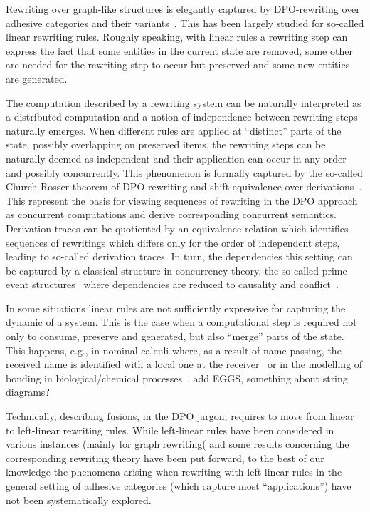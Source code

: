 Rewriting over graph-like structures is elegantly captured by
DPO-rewriting over adhesive categories and their
variants~\cite{lack2005adhesive,ehrig2006weak}.  This has been largely
studied for so-called linear rewriting rules. Roughly speaking, with
linear rules a rewriting step can express the fact that some entities
in the current state are removed, some other are needed for the
rewriting step to occur but preserved and some new entities are
generated.

The computation described by a rewriting system can be naturally
interpreted as a distributed computation and a notion of independence
between rewriting steps naturally emerges. When different rules are
applied at ``distinct'' parts of the state, possibly overlapping on
preserved items, the rewriting steps can be naturally deemed as
independent and their application can occur in any order and possibly
concurrently. This phenomenon is formally captured by the so-called
Church-Rosser theorem of DPO rewriting and shift equivalence over derivations~\cite{CMREHL:AAGT}. This represent the basis for
viewing sequences of rewriting in the DPO approach as concurrent
computations and derive corresponding concurrent semantics. Derivation
traces can be quotiented by an equivalence relation which identifies
sequences of rewritings which differs only for the order of
independent steps, leading to so-called derivation traces. In turn,
the dependencies this setting can be captured by a classical structure
in concurrency theory, the so-called prime event structures~\cite{NPW:PNES} where
dependencies are reduced to causality and conflict~\cite{Handbook,Bal:PhD,Sch:RRSG}.


In some situations linear rules are not sufficiently expressive for capturing the dynamic of a system. This is the case when  a computational step is required not only to consume, preserve and generated, but also ``merge'' parts of the state. This happens, e.g.,
in nominal calculi where, as a result of name passing,
the received name is identified with a local one at the
receiver~\cite{CVY:ESSPE,Gad07} or in the modelling of bonding in biological/chemical processes~\cite{PUY:MBPE}.
add EGGS, something about string diagrams?

Technically, describing fusions, in the DPO jargon, requires to move from linear to left-linear rewriting rules. While left-linear rules have been considered in various instances (mainly for graph rewriting( and some results concerning the corresponding rewriting theory have been put forward, to the best of our knowledge the phenomena arising when rewriting with left-linear rules in the general setting of adhesive categories (which capture most ``applications'') have not been systematically explored.

